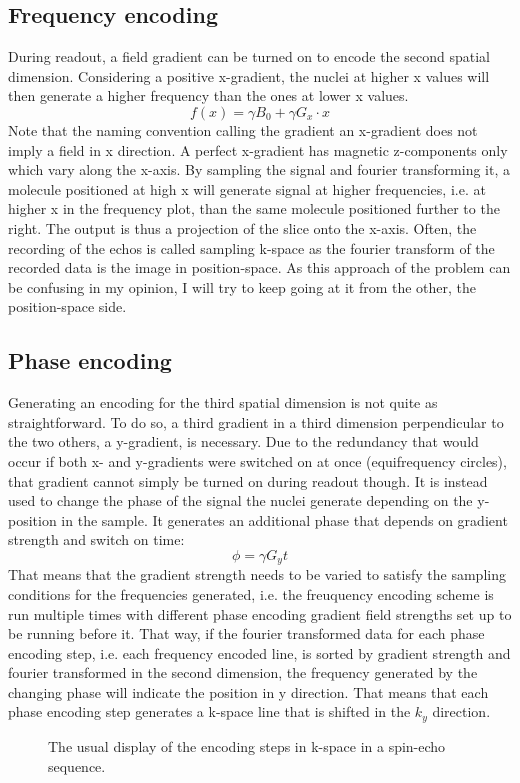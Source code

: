         \subsection{Frequency encoding}
            During readout, a field gradient can be turned on to encode the second spatial dimension. Considering a positive x-gradient, the nuclei at higher x values will then generate a higher frequency than the ones at lower x values.
            \begin{equation}
                f(x) = \gamma B_0 + \gamma G_x \cdot x
            \end{equation}
            Note that the naming convention calling the gradient an x-gradient does not imply a field in x direction. A perfect x-gradient has magnetic z-components only which vary along the x-axis. By sampling the signal and fourier transforming it, a molecule positioned at high x will generate signal at higher frequencies, i.e. at higher x in the frequency plot, than the same molecule positioned further to the right. The output is thus a projection of the slice onto the x-axis.
            Often, the recording of the echos is called sampling k-space as the fourier transform of the recorded data is the image in position-space. As this approach of the problem can be confusing in my opinion, I will try to keep going at it from the other, the position-space side.
        \subsection{Phase encoding}
            Generating an encoding for the third spatial dimension is not quite as straightforward.  To do so, a third gradient in a third dimension perpendicular to the two others, a y-gradient, is necessary.  Due to the redundancy that would occur if both x- and y-gradients were switched on at once (equifrequency circles), that gradient cannot simply be turned on during readout though.  It is instead used to change the phase of the signal the nuclei generate depending on the y-position in the sample. It generates an additional phase that depends on gradient strength and switch on time:
            \begin{equation}
                \phi = \gamma G_y t
            \end{equation}
            That means that the gradient strength needs to be varied to satisfy the sampling conditions for the frequencies generated, i.e. the freuquency encoding scheme is run multiple times with different phase encoding gradient field strengths set up to be running before it. That way, if the fourier transformed data for each phase encoding step, i.e. each frequency encoded line, is sorted by gradient strength and fourier transformed in the second dimension, the frequency generated by the changing phase will indicate the position in y direction. That means that each phase encoding step generates a k-space line that is shifted in the $k_y$ direction.
            \begin{figure}
                \centering
                \caption[k-space Graph]{The usual display of the encoding steps in k-space in a spin-echo sequence.}
            \end{figure}
